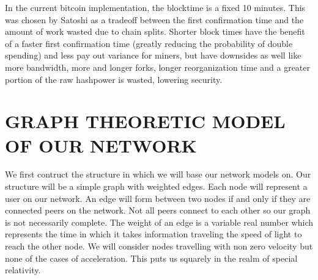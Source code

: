 \documentclass[conference]{IEEEtran}
\begin{document}
In the current bitcoin implementation, the blocktime is a fixed 10 minutes. This was chosen by Satoshi as a tradeoff between the first confirmation time and the amount of work wasted due to chain splits. Shorter block times have the benefit of a faster first confirmation time (greatly reducing the probability of double spending) and less pay out variance for miners, but have downsides as well like more bandwidth, more and longer forks, longer reorganization time and a greater portion of the raw hashpower is wasted, lowering security.

\section{GRAPH THEORETIC MODEL OF OUR NETWORK}
We first contruct the structure in which we will base our network models on. Our structure will be a simple graph with weighted edges. Each node will represent a user on our network. An edge will form between two nodes if and only if they are connected peers on the network. Not all peers connect to each other so our graph is not necessarily complete. The weight of an edge is a variable real number which represents the time in which it takes information traveling the speed of light to reach the other node. We will consider nodes travelling with non zero velocity but none of the cases of acceleration. This puts us squarely in the realm of special relativity. 
 
\end{document}
